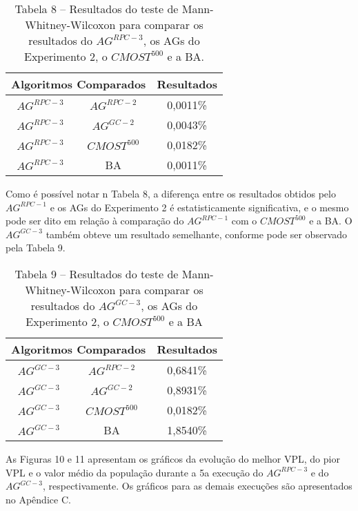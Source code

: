 \begin{table}[H]
\centering
\caption{Tabela 8 – Resultados do teste de Mann-Whitney-Wilcoxon para comparar os resultados do $AG^{RPC-3}$, os AGs do Experimento 2, o $CMOST^500$ e a BA.}

\begin{tabular}{|c|c|c|}
\hline
\multicolumn{2}{|c|}{Algoritmos Comparados} & Resultados \\ \hline
$AG^{RPC-3}$ & $AG^{RPC-2}$ & 0,0011\% \\ \hline
$AG^{RPC-3}$ & $AG^{GC-2}$ & 0,0043\% \\ \hline
$AG^{RPC-3}$ & $CMOST^500$ & 0,0182\% \\ \hline
$AG^{RPC-3}$ & BA & 0,0011\% \\ \hline

\end{tabular}
\end{table}

Como é possível notar n Tabela 8, a diferença entre os resultados obtidos pelo $AG^{RPC-1}$ e os AGs do Experimento 2 é estatisticamente significativa, e o mesmo pode ser dito em relação à comparação do $AG^{RPC-1}$ com o $CMOST^500$ e a BA. O $AG^{GC-3}$ também obteve um resultado semelhante, conforme pode ser observado pela Tabela 9.

\begin{table}[H]
\centering
\caption{Tabela 9 – Resultados do teste de Mann-Whitney-Wilcoxon para comparar os resultados do $AG^{GC-3}$, os AGs do Experimento 2, o $CMOST^500$ e a BA}

\begin{tabular}{|c|c|c|}
\hline
\multicolumn{2}{|c|}{Algoritmos Comparados} & Resultados \\ \hline
$AG^{GC-3}$ & $AG^{RPC-2}$ & 0,6841\% \\ \hline
$AG^{GC-3}$ & $AG^{GC-2}$ & 0,8931\% \\ \hline
$AG^{GC-3}$ & $CMOST^500$ & 0,0182\% \\ \hline
$AG^{GC-3}$ & BA & 1,8540\% \\ \hline

\end{tabular}
\end{table}

As Figuras 10 e 11 apresentam os gráficos da evolução do melhor VPL, do pior VPL e o valor médio da população durante a 5a execução do $AG^{RPC-3}$ e do $AG^{GC-3}$, respectivamente. Os gráficos para as demais execuções são apresentados no Apêndice C. 

